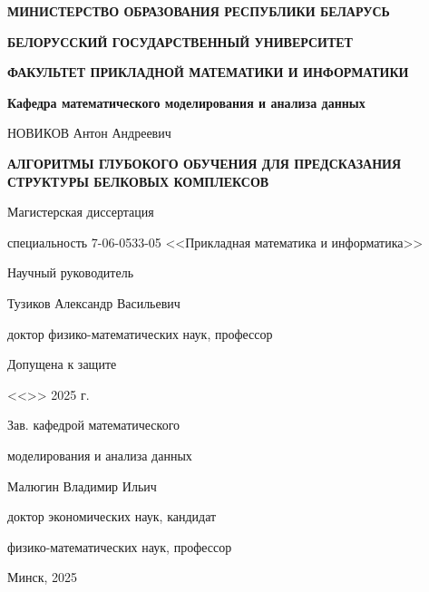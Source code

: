 \begin{titlepage}
    \begin{center}
       \textbf{МИНИСТЕРСТВО ОБРАЗОВАНИЯ РЕСПУБЛИКИ БЕЛАРУСЬ}

       \textbf{БЕЛОРУССКИЙ ГОСУДАРСТВЕННЫЙ УНИВЕРСИТЕТ}

       \textbf{ФАКУЛЬТЕТ ПРИКЛАДНОЙ МАТЕМАТИКИ И ИНФОРМАТИКИ}

       \textbf{Кафедра математического моделирования и анализа данных}
    \end{center}

    \vspace{80pt}

    \begin{center}
        НОВИКОВ Антон Андреевич
    \end{center}

    \begin{center}
        \textbf{АЛГОРИТМЫ ГЛУБОКОГО ОБУЧЕНИЯ ДЛЯ ПРЕДСКАЗАНИЯ СТРУКТУРЫ БЕЛКОВЫХ КОМПЛЕКСОВ}
    \end{center}

    \begin{center}
        Магистерская диссертация

        специальность 7-06-0533-05
        <<Прикладная математика и информатика>>
    \end{center}

    \vspace{50pt}

    \hfill
    \begin{minipage}{0.5\linewidth}
        \begin{flushleft}
            Научный руководитель
    
            Тузиков Александр Васильевич
    
            доктор физико-математических наук, профессор
    
        \end{flushleft}
    \end{minipage}

    \vspace{110pt}

    Допущена к защите

    <<\underline{\hspace{20pt}}>> \underline{\hspace{100pt}} 2025 г.

    Зав. кафедрой математического

    моделирования и анализа данных

    Малюгин Владимир Ильич

    доктор экономических наук, кандидат

    физико-математических наук, профессор    

    \vspace{90pt}

    \begin{center}
        Минск, 2025
    \end{center}
\end{titlepage}
\setcounter{page}{2}